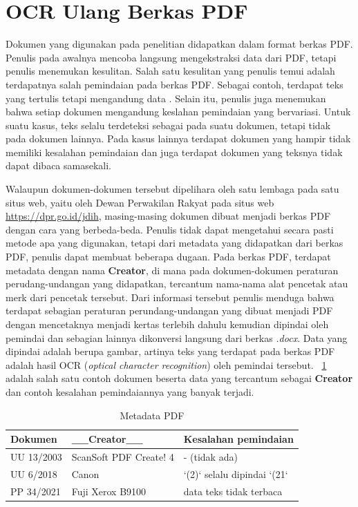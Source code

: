 \section{OCR Ulang Berkas PDF}
\label{sec:ocr-ulang-berkas-pdf}

Dokumen \legal yang digunakan pada penelitian didapatkan dalam format berkas
PDF. Penulis pada awalnya mencoba langsung mengekstraksi data dari PDF, tetapi penulis menemukan
kesulitan. Salah satu kesulitan yang penulis temui adalah terdapatnya salah pemindaian pada berkas
PDF. Sebagai contoh, terdapat teks yang tertulis  tetapi mengandung data
. Selain itu, penulis juga menemukan bahwa setiap dokumen mengandung keslahan
pemindaian yang bervariasi. Untuk suatu kasus, teks  selalu terdeteksi sebagai
 pada suatu dokumen, tetapi tidak pada dokumen lainnya. Pada kasus lainnya terdapat
dokumen yang hampir tidak memiliki kesalahan pemindaian dan juga terdapat dokumen yang teksnya tidak
dapat dibaca samasekali.

Walaupun dokumen-dokumen tersebut dipelihara oleh satu lembaga pada satu situs web, yaitu oleh Dewan
Perwakilan Rakyat pada situs web \url{https://dpr.go.id/jdih}, masing-masing dokumen dibuat menjadi
berkas PDF dengan cara yang berbeda-beda. Penulis tidak dapat mengetahui secara pasti metode apa
yang digunakan, tetapi dari metadata yang didapatkan dari berkas PDF, penulis dapat membuat beberapa
dugaan. Pada berkas PDF, terdapat metadata dengan nama \textbf{Creator}, di mana pada
dokumen-dokumen peraturan perudang-undangan yang didapatkan, tercantum nama-nama alat pencetak atau
merk dari pencetak tersebut. Dari informasi tersebut penulis menduga bahwa terdapat sebagian
peraturan perundang-undangan yang dibuat menjadi PDF dengan mencetaknya menjadi kertas terlebih
dahulu kemudian dipindai oleh pemindai dan sebagian lainnya dikonversi langsung dari berkas
\textit{.docx}. Data yang dipindai adalah berupa gambar, artinya teks yang terdapat pada berkas PDF
adalah hasil OCR (\textit{optical character recognition}) oleh pemindai tersebut.
\tab~\ref{tab:metadata-pdf} adalah salah satu contoh dokumen beserta data yang tercantum sebagai
\textbf{Creator} dan contoh kesalahan pemindaiannya yang banyak terjadi.

\begin{table}
  \centering
  \begin{tabular}{|l|l|l|}
    \hline
    Dokumen    & \_\_Creator\_\_        & Kesalahan pemindaian        \\ \hline \hline
    UU 13/2003 & ScanSoft PDF Create! 4 & - (tidak ada)               \\ \hline
    UU 6/2018  & Canon                  & `(2)` selalu dipindai `(21` \\ \hline
    PP 34/2021 & Fuji Xerox B9100       & data teks tidak terbaca     \\ \hline
  \end{tabular}
  \caption{Metadata PDF \legal}
  \label{tab:metadata-pdf}
\end{table}

